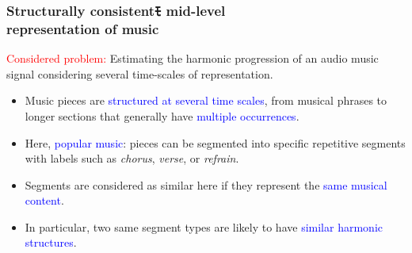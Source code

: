 \documentclass[12pt]{beamer}
\begin{document}
\begin{frame}
\frametitle{Structurally consistentﾓ mid-level \\ representation of music}

\textcolor{red}{Considered  problem:} Estimating the harmonic progression of an audio music signal considering several time-scales of representation.
%
\bigskip 


\begin{itemize}
\item Music pieces are \textcolor{blue}{structured at several time scales}, from musical phrases to longer sections that generally have \textcolor{blue}{multiple occurrences}. 

\item Here, \textcolor{blue}{popular music}: pieces can be segmented into specific repetitive segments with labels such as \textit{chorus}, \textit{verse}, or \textit{refrain}. 
\medskip

\item Segments are considered as similar here if they represent the \textcolor{blue}{same musical content}. 
\medskip

\item In particular, two same segment types are likely to have \textcolor{blue}{similar harmonic structures}. 
\medskip

\end{itemize}

\end{frame}
\end{document}
